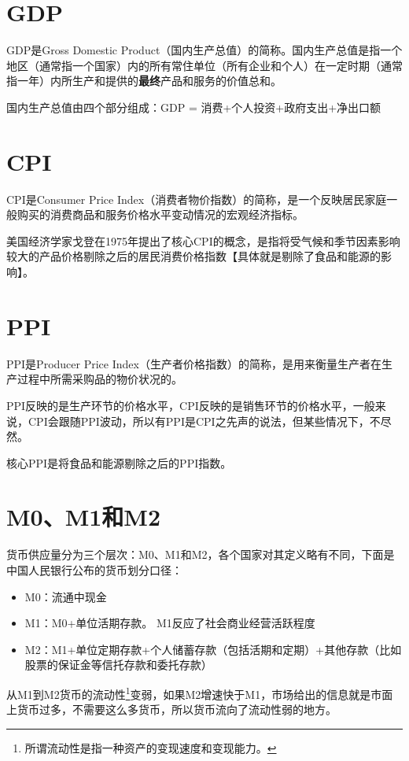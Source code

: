 \documentclass[12pt,oneside]{book}
\begin{document}
\section{GDP}
GDP是Gross Domestic Product（国内生产总值）的简称。国内生产总值是指一个地区（通常指一个国家）内的所有常住单位（所有企业和个人）在一定时期（通常指一年）内所生产和提供的\textbf{最终}产品和服务的价值总和。

国内生产总值由四个部分组成：GDP = 消费+个人投资+政府支出+净出口额


\section{CPI}
CPI是Consumer Price Index（消费者物价指数）的简称，是一个反映居民家庭一般购买的消费商品和服务价格水平变动情况的宏观经济指标。

美国经济学家戈登在1975年提出了核心CPI的概念，是指将受气候和季节因素影响较大的产品价格剔除之后的居民消费价格指数【具体就是剔除了食品和能源的影响】。

\section{PPI}
PPI是Producer Price Index（生产者价格指数）的简称，是用来衡量生产者在生产过程中所需采购品的物价状况的。

PPI反映的是生产环节的价格水平，CPI反映的是销售环节的价格水平，一般来说，CPI会跟随PPI波动，所以有PPI是CPI之先声的说法，但某些情况下，不尽然。

核心PPI是将食品和能源剔除之后的PPI指数。

\section{M0、M1和M2}
货币供应量分为三个层次：M0、M1和M2，各个国家对其定义略有不同，下面是中国人民银行公布的货币划分口径：

\begin{itemize}
\item M0：流通中现金
\item M1：M0+单位活期存款。 M1反应了社会商业经营活跃程度
\item M2：M1+单位定期存款+个人储蓄存款（包括活期和定期）+其他存款（比如股票的保证金等信托存款和委托存款）
\end{itemize}

从M1到M2货币的流动性\footnote{所谓流动性是指一种资产的变现速度和变现能力。}变弱，如果M2增速快于M1，市场给出的信息就是市面上货币过多，不需要这么多货币，所以货币流向了流动性弱的地方。 
\end{document}
